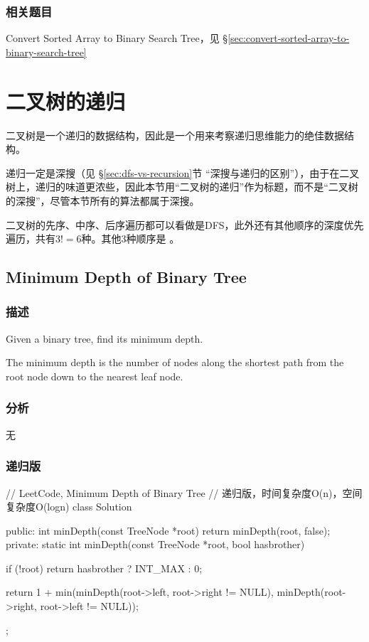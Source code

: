 \subsubsection{相关题目}
\begindot
\item Convert Sorted Array to Binary Search Tree，见 \S \ref{sec:convert-sorted-array-to-binary-search-tree}
\myenddot


\section{二叉树的递归} %
二叉树是一个递归的数据结构，因此是一个用来考察递归思维能力的绝佳数据结构。

递归一定是深搜（见 \S \ref{sec:dfs-vs-recursion}节 “深搜与递归的区别”），由于在二叉树上，递归的味道更浓些，因此本节用“二叉树的递归”作为标题，而不是“二叉树的深搜”，尽管本节所有的算法都属于深搜。

二叉树的先序、中序、后序遍历都可以看做是DFS，此外还有其他顺序的深度优先遍历，共有$3!=6$种。其他3种顺序是 。


\subsection{Minimum Depth of Binary Tree}
\label{sec:minimum-depth-of-binary-tree}


\subsubsection{描述}
Given a binary tree, find its minimum depth.

The minimum depth is the number of nodes along the shortest path from the root node down to the nearest leaf node.


\subsubsection{分析}
无


\subsubsection{递归版}
\begin{Code}
// LeetCode, Minimum Depth of Binary Tree
// 递归版，时间复杂度O(n)，空间复杂度O(logn)
class Solution {
public:
    int minDepth(const TreeNode *root) {
        return minDepth(root, false);
    }
private:
    static int minDepth(const TreeNode *root, bool hasbrother) {
        if (!root) return hasbrother ? INT_MAX : 0;

        return 1 + min(minDepth(root->left, root->right != NULL),
                minDepth(root->right, root->left != NULL));
    }
};
\end{Code}


